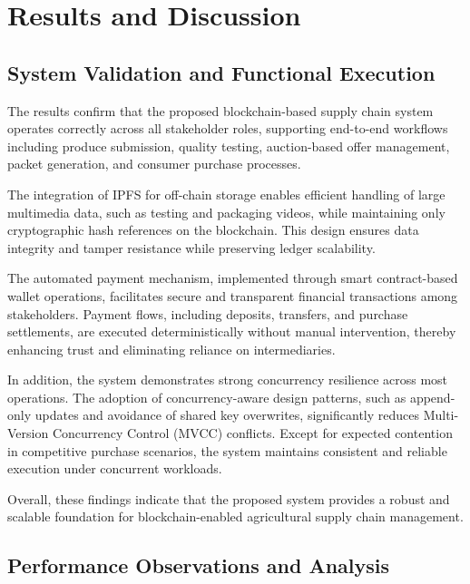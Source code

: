 \documentclass[12pt]{article}
\begin{document}
	
	
	
	
	
	\section{Results and Discussion}
	
	
	
	\subsection{System Validation and Functional Execution}
	
	The results confirm that the proposed blockchain-based supply chain system operates correctly across all stakeholder roles, supporting end-to-end workflows including produce submission, quality testing, auction-based offer management, packet generation, and consumer purchase processes.
	
	The integration of IPFS for off-chain storage enables efficient handling of large multimedia data, such as testing and packaging videos, while maintaining only cryptographic hash references on the blockchain. This design ensures data integrity and tamper resistance while preserving ledger scalability.
	
	The automated payment mechanism, implemented through smart contract-based wallet operations, facilitates secure and transparent financial transactions among stakeholders. Payment flows, including deposits, transfers, and purchase settlements, are executed deterministically without manual intervention, thereby enhancing trust and eliminating reliance on intermediaries.
	
	In addition, the system demonstrates strong concurrency resilience across most operations. The adoption of concurrency-aware design patterns, such as append-only updates and avoidance of shared key overwrites, significantly reduces Multi-Version Concurrency Control (MVCC) conflicts. Except for expected contention in competitive purchase scenarios, the system maintains consistent and reliable execution under concurrent workloads.
	
	Overall, these findings indicate that the proposed system provides a robust and scalable foundation for blockchain-enabled agricultural supply chain management.
	
	\subsection{Performance Observations and Analysis}
	
\end{document}
